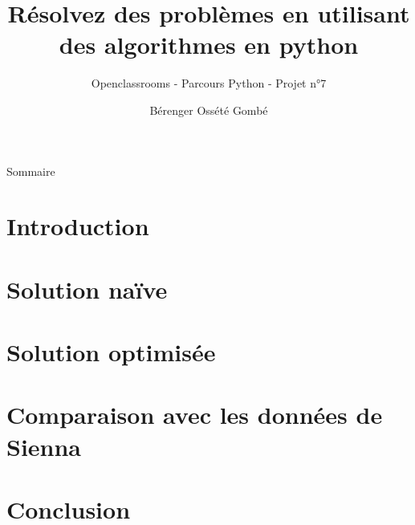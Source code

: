 \documentclass{beamer}
\title{Résolvez des problèmes en utilisant des algorithmes en python}
\subtitle{Openclassrooms - Parcours Python - Projet n°7}
\author{Bérenger Ossété Gombé}
\begin{document}
\begin{frame}
   \titlepage
\end{frame}

\begin{frame}{Sommaire}
   \tableofcontents
\end{frame}

\section{Introduction}


\section{Solution naïve}


\section{Solution optimisée}


\section{Comparaison avec les données de Sienna}


\section{Conclusion}

\end{document}
